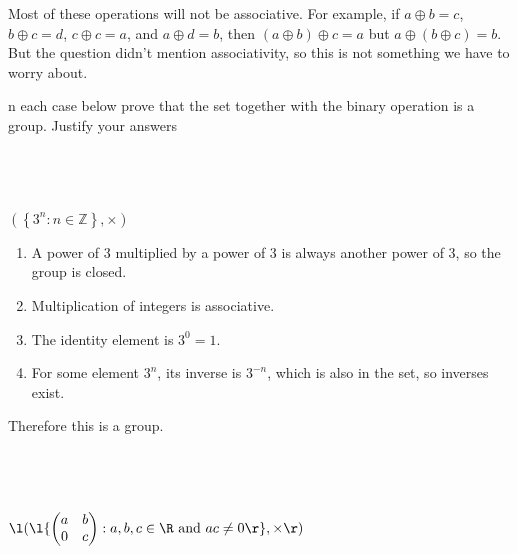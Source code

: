 \documentclass[a4paper]{article}
\begin{document}
Most of these operations will not be associative. For example, if $a \oplus b = c$, $b \oplus c = d$, $c \oplus c = a$, and $a \oplus d = b$, then $(a \oplus b) \oplus c = a$ but $a \oplus (b \oplus c) = b$. But the question didn't mention associativity, so this is not something we have to worry about.


\begin{questionbody}
n each case below prove that the set together with the binary operation is
a group. Justify your answers
\end{questionbody}

\subsection{~} %

\begin{questionbody}
$\left( \left\{ 3^n : n \in \mathbb Z \right\}, \times \right)$
\end{questionbody}

\begin{enumerate}
    \item A power of 3 multiplied by a power of 3 is always another power of 3, so the group is closed.
    \item Multiplication of integers is associative.
    \item The identity element is $3^0 = 1$.
    \item For some element $3^n$, its inverse is $3^{-n}$, which is also in the set, so inverses exist.
\end{enumerate}

Therefore this is a group.

\subsection{~} %

\begin{questionbody}
$\l( \l\{ \begin{pmatrix}a & b \\ 0 & c\end{pmatrix} : a, b, c \in \R \text{ and } ac \ne 0 \r\}, \times \r)$
\end{questionbody}
\end{document}
